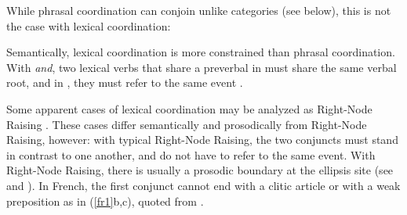 {While phrasal coordination can conjoin unlike categories (see below), this is not the case with lexical coordination:

\begin{exe}
 \ex
\begin{xlista}
\end{xlista}
\end{exe}

Semantically, lexical coordination is more constrained than phrasal coordination. With \textit{and},
two lexical verbs that share a preverbal  in  must share the same verbal root, and in
, they must refer to the same event \citep{Bosque:86}.

\eal
{}
\zl

Some apparent cases of lexical coordination may be analyzed as Right-Node Raising
\citep{Beavers}. These cases differ semantically and prosodically from Right-Node Raising, however: with typical Right-Node
Raising, the two conjuncts must stand in contrast to one another, and do not have to refer to the
same event. With Right-Node Raising, there is usually a prosodic boundary at the ellipsis site (see
\citealt[843--844]{chavesrnr} and ). In French, the first conjunct cannot end with a clitic article or with a weak preposition as in (\ref{fr1}b,c), quoted from \citep[]{Abeille:06}.

}
